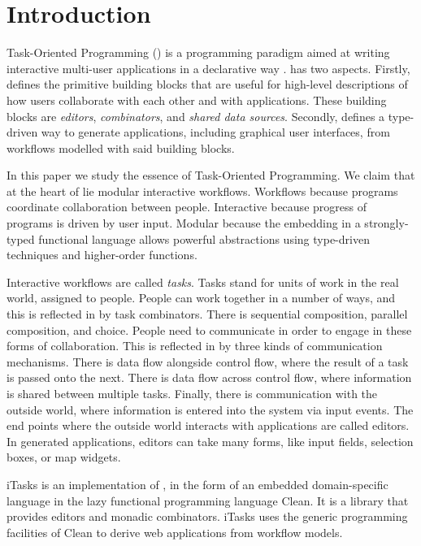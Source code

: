 


\section{Introduction}

Task-Oriented Programming (\TOP) is a programming paradigm aimed at writing interactive multi-user applications in a declarative way \cite{conf/ppdp/PlasmeijerLMAK12}.
\TOP has two aspects.
Firstly, \TOP defines the primitive building blocks that are useful for high-level descriptions of how users collaborate with each other and with applications.
These building blocks are \emph{editors}, \emph{combinators}, and \emph{shared data sources}.
Secondly, \TOP defines a type-driven way to generate applications, including graphical user interfaces, from workflows modelled with said building blocks.

In this paper we study the essence of Task-Oriented Programming.
We claim that at the heart of \TOP lie modular interactive workflows.
Workflows because \TOP programs coordinate collaboration between people.
Interactive because progress of \TOP programs is driven by user input.
Modular because the embedding in a strongly-typed functional language allows powerful abstractions using type-driven techniques and higher-order functions.

Interactive workflows are called \emph{tasks}.
Tasks stand for units of work in the real world, assigned to people.
People can work together in a number of ways, and this is reflected in \TOP by task combinators.
There is sequential composition, parallel composition, and choice.
People need to communicate in order to engage in these forms of collaboration.
This is reflected in \TOP by three kinds of communication mechanisms.
There is data flow alongside control flow, where the result of a task is passed onto the next.
There is data flow across control flow, where information is shared between multiple tasks.
Finally, there is communication with the outside world, where information is entered into the system via input events.
The end points where the outside world interacts with applications are called editors.
In generated applications, editors can take many forms, like input fields, selection boxes, or map widgets.

iTasks is an implementation of \TOP, in the form of an embedded domain-specific language in the lazy functional programming language Clean.
It is a library that provides editors and monadic combinators.
iTasks uses the generic programming facilities of Clean to derive web applications from workflow models.

